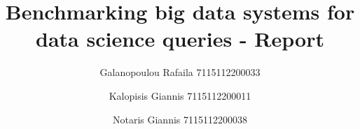 %
\begin{titlepage}
  \title{Benchmarking big data systems for data science queries - Report}
  \author{
  Galanopoulou Rafaila 7115112200033 
  \and
  Kalopisis Giannis 7115112200011
  \and
  Notaris Giannis 7115112200038}
  \maketitle
\end{titlepage}
\clearpage
